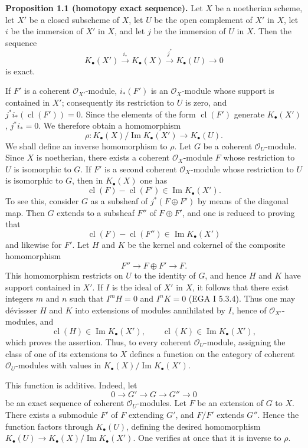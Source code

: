 \documentclass[11pt]{article}
\newcommand{\cl}{\operatorname{cl}}
\begin{document}
\textbf{Proposition 1.1 (homotopy exact sequence).} Let $X$ be a noetherian scheme, let $X'$ be a closed subscheme of $X$, let $U$ be the open complement of $X'$ in $X$, let $i$ be the immersion of $X'$ in $X$, and let $j$ be the immersion of $U$ in $X$. Then the sequence
\[
 K_\bullet(X')\xrightarrow{i_*}K_\bullet(X)\xrightarrow{j^*}K_\bullet(U)\longrightarrow 0
\]
is exact.

If $F'$ is a coherent $\mathcal O_{X'}$-module, $i_*(F')$ is an $\mathcal O_X$-module whose support is contained in $X'$; consequently its restriction to $U$ is zero, and $j^*i_*(\cl(F'))=0$. Since the elements of the form $\cl(F')$ generate $K_\bullet(X')$, $j^*i_*=0$. We therefore obtain a homomorphism
\[
 \rho:K_\bullet(X)/\operatorname{Im}K_\bullet(X')\longrightarrow K_\bullet(U).
\]
We shall define an inverse homomorphism to $\rho$. Let $G$ be a coherent $\mathcal O_U$-module. Since $X$ is noetherian, there exists a coherent $\mathcal O_X$-module $F$ whose restriction to $U$ is isomorphic to $G$. If $F'$ is a second coherent $\mathcal O_X$-module whose restriction to $U$ is isomorphic to $G$, then in $K_\bullet(X)$ one has
\[
 \cl(F)-\cl(F')\in \operatorname{Im}K_\bullet(X').
\]
To see this, consider $G$ as a subsheaf of $j^*(F\oplus F')$ by means of the diagonal map. Then $G$ extends to a subsheaf $F''$ of $F\oplus F'$, and one is reduced to proving that
\[
 \cl(F)-\cl(F'')\in \operatorname{Im}K_\bullet(X')
\]
and likewise for $F'$. Let $H$ and $K$ be the kernel and cokernel of the composite homomorphism
\[
 F''\longrightarrow F\oplus F'\longrightarrow F.
\]
This homomorphism restricts on $U$ to the identity of $G$, and hence $H$ and $K$ have support contained in $X'$. If $I$ is the ideal of $X'$ in $X$, it follows that there exist integers $m$ and $n$ such that $I^mH=0$ and $I^nK=0$ (EGA I 5.3.4). Thus one may dévissser $H$ and $K$ into extensions of modules annihilated by $I$, hence of $\mathcal O_{X'}$-modules, and
\[
 \cl(H)\in\operatorname{Im}K_\bullet(X'),\qquad \cl(K)\in\operatorname{Im}K_\bullet(X'),
\]
which proves the assertion. Thus, to every coherent $\mathcal O_U$-module, assigning the class of one of its extensions to $X$ defines a function on the category of coherent $\mathcal O_U$-modules with values in $K_\bullet(X)/\operatorname{Im}K_\bullet(X')$.

This function is additive. Indeed, let
\[
0\longrightarrow G'\longrightarrow G\longrightarrow G''\longrightarrow 0
\]
be an exact sequence of coherent $\mathcal O_U$-modules. Let $F$ be an extension of $G$ to $X$. There exists a submodule $F'$ of $F$ extending $G'$, and $F/F'$ extends $G''$. Hence the function factors through $K_\bullet(U)$, defining the desired homomorphism $K_\bullet(U)\to K_\bullet(X)/\operatorname{Im}K_\bullet(X')$. One verifies at once that it is inverse to $\rho$.
\end{document}
